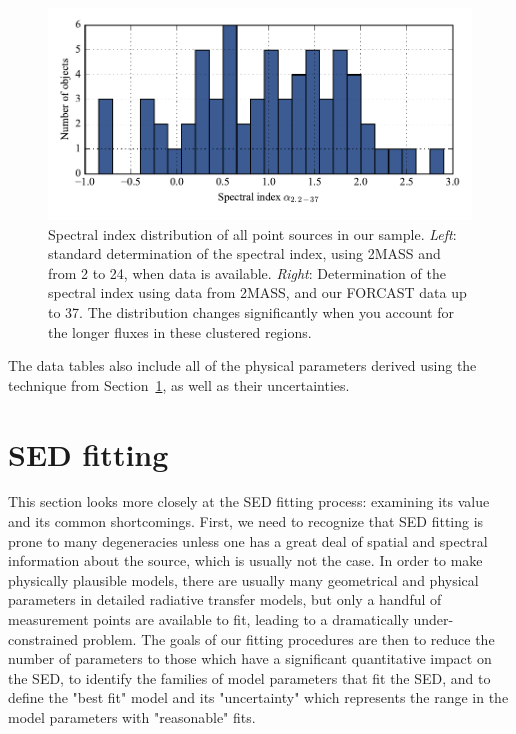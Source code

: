 \begin{figure}[!h]
\begin{center}
\includegraphics[width=\textwidth]{Figures/SpectralIndex.pdf}
\vspace{-1cm}
\caption[Spectral Index distribution of point sources]{Spectral index distribution of all point sources in our sample. \textit{Left}: standard determination of the spectral index, using 2MASS and \Spitzer from \SI{2}{\micron} to \SI{24}{\micron}, when data is available. \textit{Right}: Determination of the spectral index using data from 2MASS, \Spitzer and our FORCAST data up to \SI{37}{\micron}. The distribution changes significantly when you account for the longer fluxes in these clustered regions.}
\label{fig:SpectralIndex}
\end{center}
\end{figure}

The data tables also include all of the physical parameters derived using the technique from Section~\ref{sec:SEDFitting}, as well as their uncertainties.

\section{SED fitting}
\label{sec:SEDFitting}

This section looks more closely at the SED fitting process: examining its value and its common shortcomings. First, we need to recognize that SED fitting is prone to many degeneracies \citep[see e.g.][for an introduction on the degeneracies of SED fitting]{Robitaille:2007dl} unless one has a great deal of spatial and spectral information about the source, which is usually not the case. In order to make physically plausible models, there are
usually many geometrical and physical parameters in detailed radiative transfer models, but only a handful of measurement points are available to fit, leading to a dramatically under-constrained problem. The goals of our fitting procedures are then to reduce the number of parameters to those which have a significant quantitative impact on the SED, to identify the families of model parameters that fit the SED, and to define the "best fit" model and its "uncertainty" which represents the range in the model parameters with "reasonable" fits.

